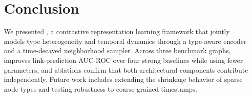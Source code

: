\section{Conclusion}
We presented \sysname{}, a contrastive representation learning framework
that jointly models type heterogeneity and temporal dynamics through a
type-aware encoder and a time-decayed neighborhood sampler. Across three
benchmark graphs, \sysname{} improves link-prediction AUC-ROC over four
strong baselines while using fewer parameters, and ablations confirm that
both architectural components contribute independently. Future work
includes extending the shrinkage behavior of sparse node types and testing
robustness to coarse-grained timestamps.

